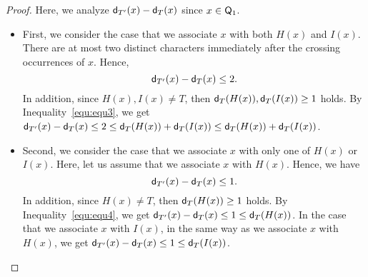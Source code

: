 \begin{proof}
    Here, we analyze $\mathsf{d}_{T'}(x)-\mathsf{d}_T{(x)}$ since $x \in \mathsf{Q}_{\mathrm{1}}$.
    \begin{itemize}
    \item
    First, we consider the case that we associate $x$ with both $H(x)$ and $I(x)$.
    There are at most two distinct characters immediately after the crossing occurrences of $x$.
    Hence,
    \begin{equation}\label{equ:equ3}
      \mathsf{d}_{T'}(x)-\mathsf{d}_T{(x)} \le 2.
    \end{equation}
    In addition, since ${H(x),I(x) \ne T}$, then $\mathsf{d}_{T}(H(x)),\mathsf{d}_{T}(I(x)) \ge 1$ holds.
    By Inequality~\ref{equ:equ3}, we get $\mathsf{d}_{T'}(x)-\mathsf{d}_T{(x)} \le 2 \le \mathsf{d}_{T}(H(x))+\mathsf{d}_{T}(I(x)) \le \mathsf{d}_{T}(H(x))+\mathsf{d}_{T}(I(x))$.

    \item
    Second, we consider the case that we associate $x$ with only one of $H(x)$ or $I(x)$.
    Here, let us assume that we associate $x$ with $H(x)$.
    Hence, we have
    \begin{equation}\label{equ:equ4}
      \mathsf{d}_{T'}(x)-\mathsf{d}_T{(x)} \le 1.
    \end{equation}
    In addition, since ${H(x) \ne T}$, then $\mathsf{d}_{T}(H(x)) \ge 1$ holds.
    By Inequality~\ref{equ:equ4}, we get $\mathsf{d}_{T'}(x)-\mathsf{d}_T{(x)} \le 1 \le \mathsf{d}_{T}(H(x))$.
    In the case that we associate $x$ with $I(x)$, in the same way as we associate $x$ with $H(x)$, we get $\mathsf{d}_{T'}(x)-\mathsf{d}_T{(x)} \le 1 \le \mathsf{d}_{T}(I(x))$.
    \end{itemize}


\end{proof}
